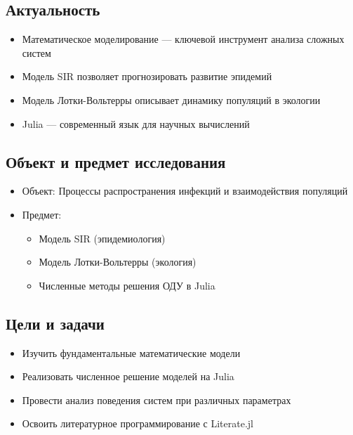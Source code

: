 \documentclass[
  letterpaper,
  DIV=11,
  numbers=noendperiod]{scrartcl}
\providecommand{\tightlist}{%
  \setlength{\itemsep}{0pt}\setlength{\parskip}{0pt}}\usepackage{longtable,booktabs,array}
\begin{document}
\subsection{Актуальность}\label{ux430ux43aux442ux443ux430ux43bux44cux43dux43eux441ux442ux44c}

\begin{itemize}
\tightlist
\item
  Математическое моделирование --- ключевой инструмент анализа сложных
  систем
\item
  Модель SIR позволяет прогнозировать развитие эпидемий
\item
  Модель Лотки-Вольтерры описывает динамику популяций в экологии
\item
  Julia --- современный язык для научных вычислений
\end{itemize}

\subsection{Объект и предмет
исследования}\label{ux43eux431ux44aux435ux43aux442-ux438-ux43fux440ux435ux434ux43cux435ux442-ux438ux441ux441ux43bux435ux434ux43eux432ux430ux43dux438ux44f}

\begin{itemize}
\tightlist
\item
  Объект: Процессы распространения инфекций и взаимодействия популяций
\item
  Предмет:

  \begin{itemize}
  \tightlist
  \item
    Модель SIR (эпидемиология)
  \item
    Модель Лотки-Вольтерры (экология)
  \item
    Численные методы решения ОДУ в Julia
  \end{itemize}
\end{itemize}

\subsection{Цели и
задачи}\label{ux446ux435ux43bux438-ux438-ux437ux430ux434ux430ux447ux438}

\begin{itemize}
\tightlist
\item
  Изучить фундаментальные математические модели
\item
  Реализовать численное решение моделей на Julia
\item
  Провести анализ поведения систем при различных параметрах
\item
  Освоить литературное программирование с Literate.jl
\end{itemize}
\end{document}

